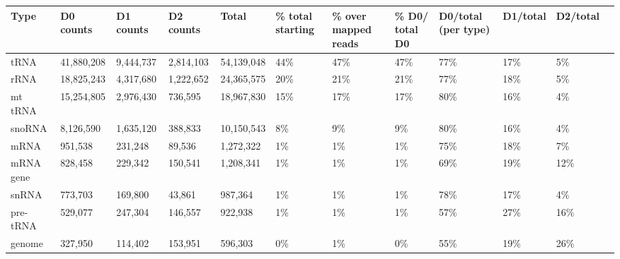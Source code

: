 \documentclass[12pt]{rockefeller}
\begin{document}
\begin{table}[h!]
  \begin{adjustbox}{max width = \textwidth}
  \def\arraystretch{1.5}
  \tabulinesep=1.2mm  

  \begin{tabular}{|l|l|l|l|l|l|l|l|l|l|l|l}
\hline
           Type &   D0 counts &   D1 counts &  D2 counts &        Total & \multicolumn{1}{m{2.5cm}|}{\% total starting}  & \multicolumn{1}{m{2cm}|}{\% over mapped reads}  & \multicolumn{1}{m{2.5cm}|}{\% D0/ total D0} & \multicolumn{1}{m{2cm}|}{D0/total (per type)} & D1/total & D2/total \\
\hline
           tRNA &  41,880,208 &   9,444,737 &  2,814,103 &   54,139,048 &               44\% &                  47\% &            47\% &                 77\% &      17\% &       5\% \\
           rRNA &  18,825,243 &   4,317,680 &  1,222,652 &   24,365,575 &               20\% &                  21\% &            21\% &                 77\% &      18\% &       5\% \\
        mt tRNA &  15,254,805 &   2,976,430 &    736,595 &   18,967,830 &               15\% &                  17\% &            17\% &                 80\% &      16\% &       4\% \\
         snoRNA &   8,126,590 &   1,635,120 &    388,833 &   10,150,543 &                8\% &                   9\% &             9\% &                 80\% &      16\% &       4\% \\
           mRNA &     951,538 &     231,248 &     89,536 &    1,272,322 &                1\% &                   1\% &             1\% &                 75\% &      18\% &       7\% \\
      mRNA gene &     828,458 &     229,342 &    150,541 &    1,208,341 &                1\% &                   1\% &             1\% &                 69\% &      19\% &      12\% \\
          snRNA &     773,703 &     169,800 &     43,861 &      987,364 &                1\% &                   1\% &             1\% &                 78\% &      17\% &       4\% \\
      pre-tRNA &     529,077 &     247,304 &    146,557 &      922,938 &                1\% &                   1\% &             1\% &                 57\% &      27\% &      16\% \\
         genome &     327,950 &     114,402 &    153,951 &      596,303 &                0\% &                   1\% &             0\% &                 55\% &      19\% &      26\% \\

\end{tabular}
\end{adjustbox}
\end{table}
\end{document}
